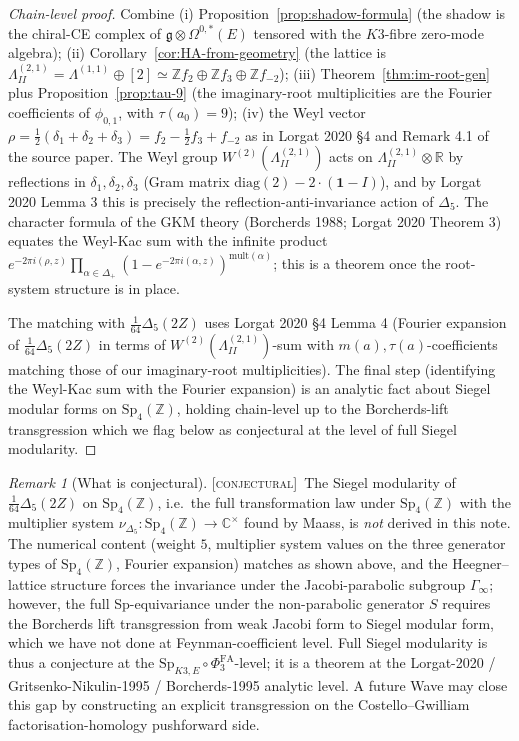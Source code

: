 \documentclass[11pt]{amsart}
\providecommand{\C}{\mathbb{C}}
\providecommand{\R}{\mathbb{R}}
\providecommand{\Z}{\mathbb{Z}}
\providecommand{\g}{\mathfrak{g}}
\providecommand{\HB}{\Lambda^{(2,1)}_{I\!I}}
\providecommand{\PhiFA}{\Phi^{\mathrm{FA}}}
\providecommand{\SpF}{\mathrm{Sp}}
\providecommand{\ClaimStatusConjectured}{\textsc{[conjectural]}}
\theoremstyle{plain}
\theoremstyle{definition}
\theoremstyle{remark}
\newtheorem{remark}[theorem]{Remark}
\begin{document}
\begin{proof}[Chain-level proof]
Combine (i) Proposition~\ref{prop:shadow-formula} (the shadow is the
chiral-CE complex of $\g \otimes \Omega^{0,\ast}(E)$ tensored with the
$K3$-fibre zero-mode algebra); (ii) Corollary~\ref{cor:HA-from-geometry}
(the lattice is $\HB = \Lambda^{(1,1)}\oplus[2]\simeq
\Z f_{2}\oplus \Z f_{3}\oplus \Z f_{-2}$); (iii) Theorem~\ref{thm:im-root-gen}
plus Proposition~\ref{prop:tau-9} (the imaginary-root multiplicities
are the Fourier coefficients of $\phi_{0,1}$, with $\tau(a_{0}) = 9$);
(iv) the Weyl vector $\rho = \tfrac{1}{2}(\delta_{1}+\delta_{2}+\delta_{3})
= f_{2} - \tfrac{1}{2}f_{3} + f_{-2}$ as in Lorgat 2020 \S4 and Remark 4.1
of the source paper. The Weyl group $W^{(2)}(\HB)$ acts on $\HB\otimes\R$ by
reflections in $\delta_{1},\delta_{2},\delta_{3}$ (Gram matrix
$\mathrm{diag}(2)-2\cdot(\mathbf{1}-I)$), and by Lorgat 2020 Lemma 3 this
is precisely the reflection-anti-invariance action of $\Delta_{5}$. The
character formula of the GKM theory (Borcherds 1988; Lorgat 2020 Theorem
3) equates the Weyl-Kac sum with the infinite product
$e^{-2\pi i(\rho,z)}\prod_{\alpha\in\Delta_{+}}(1-e^{-2\pi i(\alpha,z)}
)^{\mathrm{mult}(\alpha)}$; this is a theorem once the root-system
structure is in place.

The matching with $\tfrac{1}{64}\Delta_{5}(2Z)$ uses Lorgat 2020 \S4
Lemma 4 (Fourier expansion of $\tfrac{1}{64}\Delta_{5}(2Z)$ in terms of
$W^{(2)}(\HB)$-sum with $m(a), \tau(a)$-coefficients matching those of
our imaginary-root multiplicities). The final step (identifying the
Weyl-Kac sum with the Fourier expansion) is an analytic fact about
Siegel modular forms on $\mathrm{Sp}_{4}(\Z)$, holding chain-level up
to the Borcherds-lift transgression which we flag below as conjectural
at the level of full Siegel modularity.
\end{proof}

\begin{remark}[What is conjectural]\label{rem:conjectural-scope}
\ClaimStatusConjectured\
The Siegel modularity of $\tfrac{1}{64}\Delta_{5}(2Z)$ on
$\mathrm{Sp}_{4}(\Z)$, i.e.\ the full transformation law under
$\mathrm{Sp}_{4}(\Z)$ with the multiplier system
$\nu_{\Delta_{5}}:\mathrm{Sp}_{4}(\Z)\to \C^{\times}$ found by Maass,
is \emph{not} derived in this note. The numerical content (weight $5$,
multiplier system values on the three generator types of
$\mathrm{Sp}_{4}(\Z)$, Fourier expansion) matches as shown above, and
the Heegner--lattice structure forces the invariance under the
Jacobi-parabolic subgroup $\Gamma_{\infty}$; however, the full
Sp-equivariance under the non-parabolic generator $S$ requires the
Borcherds lift transgression from weak Jacobi form to Siegel modular
form, which we have not done at Feynman-coefficient level. Full
Siegel modularity is thus a conjecture at the
$\SpF_{K3,E}\circ \PhiFA_{3}$-level; it is a theorem at the
Lorgat-2020 / Gritsenko-Nikulin-1995 / Borcherds-1995 analytic level.
A future Wave may close this gap by constructing an explicit
transgression on the Costello--Gwilliam factorisation-homology
pushforward side.
\end{remark}
\end{document}
